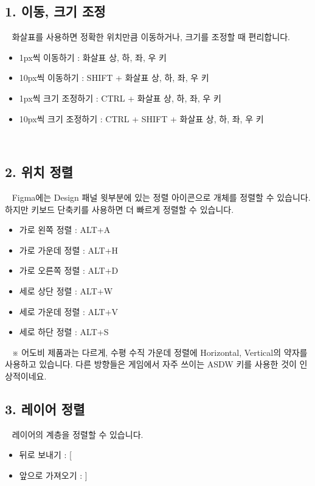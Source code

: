 \documentclass[12pt, a4paper, oneside]{book}
\begin{document}
	\subsection{1. 이동, 크기 조정}
 
화살표를 사용하면 정확한 위치만큼 이동하거나, 크기를 조정할 때 편리합니다.

			\begin{itemize}[topsep=0.0em, parsep=0.0em, itemsep=0em, leftmargin=6.0em, labelwidth=3em, labelsep=1em] 
			\item 	1px씩 이동하기 : 화살표 상, 하, 좌, 우 키
			\item 	10px씩 이동하기 : SHIFT + 화살표 상, 하, 좌, 우 키
			\item 	1px씩 크기 조정하기 : CTRL + 화살표 상, 하, 좌, 우 키
			\item 	10px씩 크기 조정하기 : CTRL + SHIFT + 화살표 상, 하, 좌, 우 키
			\end{itemize}


 


	\subsection{2. 위치 정렬}
 
Figma에는 Design 패널 윗부분에 있는 정렬 아이콘으로 개체를 정렬할 수 있습니다. 하지만 키보드 단축키를 사용하면 더 빠르게 정렬할 수 있습니다.
 

			\begin{itemize}[topsep=0.0em, parsep=0.0em, itemsep=0em, leftmargin=6.0em, labelwidth=3em, labelsep=1em] 
			\item 	가로 왼쪽 정렬 : ALT+A
			\item 	가로 가운데 정렬 : ALT+H
			\item 	가로 오른쪽 정렬 : ALT+D
			\item 	세로 상단 정렬 : ALT+W
			\item 	세로 가운데 정렬 : ALT+V
			\item 	세로 하단 정렬 : ALT+S
			\end{itemize}

 
※ 어도비 제품과는 다르게, 수평 수직 가운데 정렬에 Horizontal, Vertical의 약자를 사용하고 있습니다. 
다른 방향들은 게임에서 자주 쓰이는 ASDW 키를 사용한 것이 인상적이네요.

	\subsection{3. 레이어 정렬}
 
레이어의 계층을 정렬할 수 있습니다.
 

			\begin{itemize}[topsep=0.0em, parsep=0.0em, itemsep=0em, leftmargin=6.0em, labelwidth=3em, labelsep=1em] 
			\item 	뒤로 보내기 : [
			\item 	앞으로 가져오기 : ]
			\end{itemize}
\end{document}

